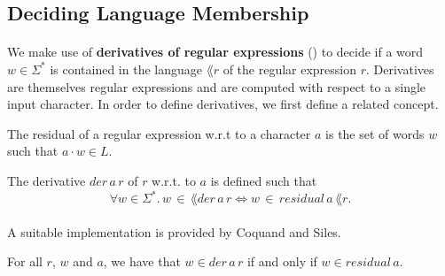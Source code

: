 \documentclass[11pt,a4paper,oneside]{book}
\begin{document}

                \subsection{Deciding Language Membership}
                    \paragraph{}
                        We make use of \textbf{derivatives of regular expressions} (\cite{DBLP:journals/jacm/Brzozowski64}) to decide if a word $w \in \Sigma^*$ is contained in the language $\lang{r}$ of the regular expression $r$. 
                        Derivatives are themselves regular expressions and are computed with respect to a single input character. 
                        In order to define derivatives, we first define a related concept.

                    \begin{definition}{}
                        \label{residual}
                        The residual of a regular expression w.r.t to a character $a$ is the set of words $w$ such that $a \cdot w \in L$.
                    \end{definition}

                    \begin{definition}{}
                        \label{residual}
                        The derivative $der \,  a \, r$ of $r$ w.r.t. to $a$ is defined such that 
                        \[
                            \forall w \in \Sigma^*. \, w \, \in \, \lang{der \, a \, r} \Leftrightarrow w \, \in \, residual \, a \, \lang{r}.
                        \]
                    \end{definition}

                    \paragraph{}
                        A suitable implementation is provided by Coquand and Siles.



                    \begin{theorem}
                        \label{der_correct}
                        For all $r$, $w$ and $a$, we have that $w \in der \, a \, r$ if and only if $w \in residual \, a $.
                    \end{theorem}
\end{document}
